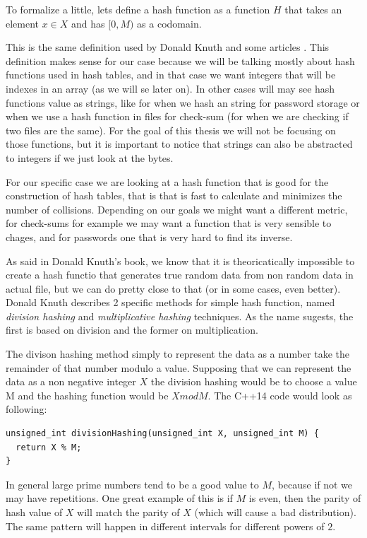 \bigskip

To formalize a little, lets define a hash function as a function \( H \) that takes an element \( x \in X \) and has \( [0, M) \) as a codomain.

This is the same definition used by Donald Knuth \cite{TAOCP3} and some articles \cite{RobinHoodHashing}. This definition makes sense for our case because we will be talking mostly about hash functions used in hash tables, and in that case we want integers that will be indexes in an array (as we will se later on). In other cases will may see hash functions value as strings, like for when we hash an string for password storage or when we use a hash function in files for check-sum (for when we are checking if two files are the same). For the goal of this thesis we will not be focusing on those functions, but it is important to notice that strings can also be abstracted to integers if we just look at the bytes.

For our specific case we are looking at a hash function that is good for the construction of hash tables, that is that is fast to calculate and minimizes the number of collisions. Depending on our goals we might want a different metric, for check-sums for example we may want a function that is very sensible to chages, and for passwords one that is very hard to find its inverse.

As said in Donald Knuth's book, we know that it is theoricatically impossible to create a hash functio that generates true random data from non random data in actual file, but we can do pretty close to that (or in some cases, even better).  Donald Knuth describes 2 specific methods for simple hash function, named \textit{division hashing} and \textit{multiplicative hashing} techniques. As the name sugests, the first is based on division and the former on multiplication.

The divison hashing method simply to represent the data as a number take the remainder of that number modulo a value. Supposing that we can represent the data as a non negative integer \( X \) the division hashing would be to choose a value M and the hashing function would be \( X mod M \). The C++14 code would look as following:

\begin{lstlisting}
unsigned_int divisionHashing(unsigned_int X, unsigned_int M) {
  return X % M;
}
\end{lstlisting}

In general large prime numbers tend to be a good value to \( M \), because if not we may have repetitions. One great example of this is if \( M \) is even, then the parity of hash value of \( X \) will match the parity of \( X \) (which will cause a bad distribution). The same pattern will happen in different intervals for different powers of \( 2 \).

